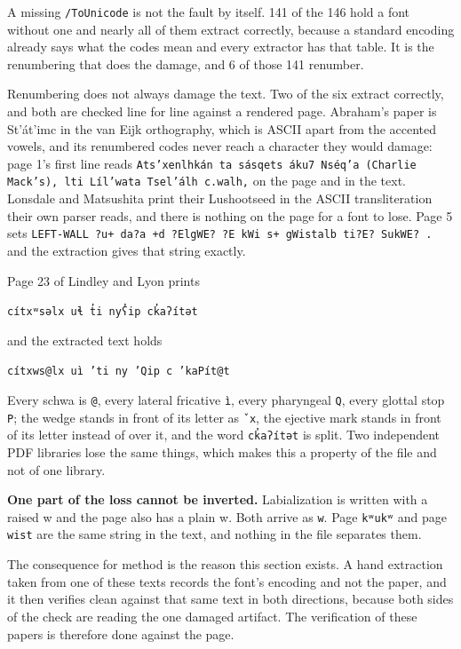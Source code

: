 A missing \texttt{/ToUnicode} is not the fault by itself. 141 of the 146 hold a font without one and nearly all of them extract correctly, because a standard encoding already says what the codes mean and every extractor has that table. It is the renumbering that does the damage, and 6 of those 141 renumber.

Renumbering does not always damage the text. Two of the six extract correctly, and both are checked line for line against a rendered page. Abraham's paper is St'át'imc in the van Eijk orthography, which is ASCII apart from the accented vowels, and its renumbered codes never reach a character they would damage: page 1's first line reads \texttt{Ats’xenlhkán ta sásqets áku7 Nséq’a (Charlie Mack’s), lti Líl’wata Tsel’álh c.walh,} on the page and in the text. Lonsdale and Matsushita print their Lushootseed in the ASCII transliteration their own parser reads, and there is nothing on the page for a font to lose. Page 5 sets \texttt{LEFT-WALL ?u+ da?a +d ?ElgWE? ?E kWi s+ gWistalb ti?E? SukWE? .} and the extraction gives that string exactly.

Page 23 of Lindley and Lyon prints

\texttt{cítxʷsəlx uɬ t̓i nyʕ̓ip ck̓aʔítət}

and the extracted text holds

\texttt{cítxws@lx uì ’ti ny ’Qip c ’kaPít@t}

Every schwa is \texttt{@}, every lateral fricative \texttt{ì}, every pharyngeal \texttt{Q}, every glottal stop \texttt{P}; the wedge stands in front of its letter as \texttt{ˇx}, the ejective mark stands in front of its letter instead of over it, and the word \texttt{ck̓aʔítət} is split. Two independent PDF libraries lose the same things, which makes this a property of the file and not of one library.

\textbf{One part of the loss cannot be inverted.} Labialization is written with a raised w and the page also has a plain w. Both arrive as \texttt{w}. Page \texttt{kʷukʷ} and page \texttt{wist} are the same string in the text, and nothing in the file separates them.

The consequence for method is the reason this section exists. A hand extraction taken from one of these texts records the font's encoding and not the paper, and it then verifies clean against that same text in both directions, because both sides of the check are reading the one damaged artifact. The verification of these papers is therefore done against the page.

